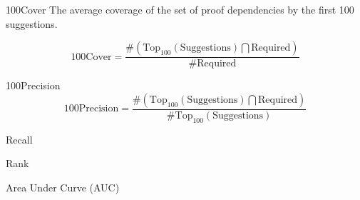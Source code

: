 
\begin{definition}{100Cover}
The average coverage of the set of proof dependencies by the first 100 suggestions.

\[ \text{100Cover} = \frac{ \#( \text{Top}_{100}(\text{Suggestions}) \bigcap \text{Required}) } { \#\text{Required} } \]
\end{definition}


\begin{definition}{100Precision}
\[ \text{100Precision} = \frac{ \#( \text{Top}_{100}(\text{Suggestions}) \bigcap \text{Required}) } { \#\text{Top}_{100}(\text{Suggestions}) } \]
\end{definition}

\begin{definition}{Recall}
\end{definition}

\begin{definition}{Rank}
\end{definition}

\begin{definition}{Area Under Curve (AUC)}
\end{definition}

